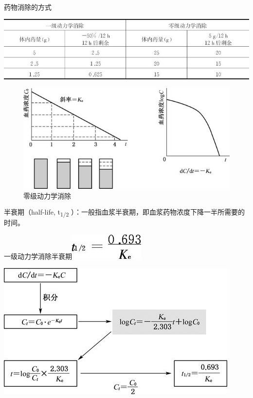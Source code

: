 \begin{table}[htbp]
\centering
\caption{药物消除的方式}
\label{tab3-4}
\includegraphics{./images/Image00049.jpg}
\end{table}

\begin{figure}[!htbp]
 \centering
 \includegraphics{./images/Image00050.jpg}
 \captionsetup{justification=centering}
 \caption{零级动力学消除}
 \label{fig3-16}
  \end{figure} 

半衰期（half-life, t\textsubscript{1/2}
）：一般指血浆半衰期，即血浆药物浓度下降一半所需要的时间。

一级动力学消除半衰期\includegraphics{./images/Image00051.jpg}

\includegraphics{./images/Image00052.jpg}

